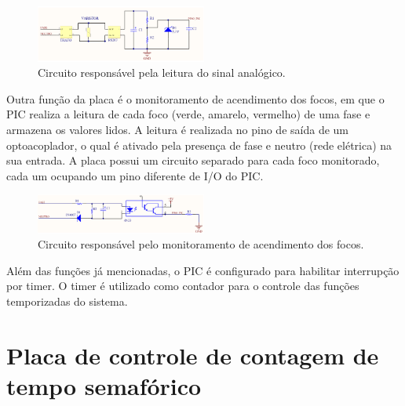 \begin{figure}[ht]
    \begin{center}
    \includegraphics[width=0.5\textwidth]{figuras/trafo.PNG}
    \end{center}
    \caption[Detecção da lâmpada]{Circuito responsável pela leitura do sinal analógico.}
    \label{trafo}
\end{figure}

Outra função da placa é o monitoramento de acendimento dos focos, em que o PIC realiza a leitura de cada foco (verde, amarelo, vermelho) de uma fase e armazena os valores lidos. A leitura é realizada no pino de saída de um optoacoplador, o qual é ativado pela presença de fase e neutro (rede elétrica) na sua entrada. A placa possui um circuito separado para cada foco monitorado, cada um ocupando um pino diferente de I/O do PIC.

\begin{figure}[ht]
    \begin{center}
    \includegraphics[width=0.5\textwidth]{figuras/4n33.PNG}
    \end{center}
    \caption[Detecção de presença de fase]{Circuito responsável pelo monitoramento de acendimento dos focos.}
    \label{4n33}
\end{figure}

Além das funções já mencionadas, o PIC é configurado para habilitar interrupção por timer. O timer é utilizado como contador para o controle das funções temporizadas do sistema. 

\section{Placa de controle de contagem de tempo semafórico}


